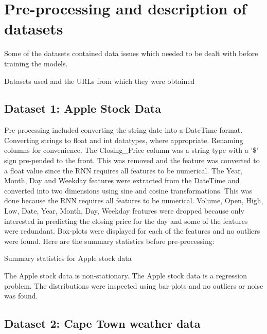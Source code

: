 \documentclass[conference]{IEEEtran}
\begin{document}
\section{Pre-processing and description of datasets}

Some of the datasets contained data issues which needed to be dealt with before training the models.

\begin{table}[H]
	\centering
	\caption{Datasets used and the URLs from which they were obtained}
	\label{tab:links}
\end{table}

\subsection{Dataset 1: Apple Stock Data}

Pre-processing included converting the string date into a DateTime format. Converting strings to float and int datatypes, where appropriate. Renaming columns for convenience. The Closing\_Price column was a string type with a '\$' sign pre-pended to the front. This was removed and the feature was converted to a float value since the RNN requires all features to be numerical. The Year, Month, Day and Weekday features were extracted from the DateTime and converted into two dimensions using sine and cosine transformations. This was done because the RNN requires all features to be numerical. Volume, Open, High, Low, Date, Year, Month, Day, Weekday features were dropped because only interested in predicting the closing price for the day and some of the features were redundant. Box-plots were displayed for each of the features and no outliers were found. Here are the summary statistics before pre-processing:

\begin{table}[H]
	\caption{Summary statistics for Apple stock data}
	\label{tab:apple-stats}
\end{table}

The Apple stock data is non-stationary. The Apple stock data is a regression problem. The distributions were inspected using bar plots and no outliers or noise was found.

\subsection{Dataset 2: Cape Town weather data}
\end{document}
